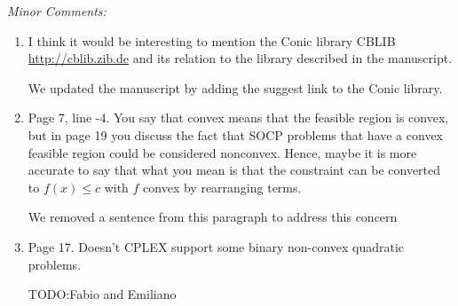 \documentclass[11pt]{article}
\newcommand{\rep}[1]{{\textcolor{acblue}{#1}}}
\newcommand{\leo}[1]{{\color{red}#1}}
\begin{document}
{\it
Minor Comments:
\begin{enumerate}

\item I think it would be interesting to mention the Conic library CBLIB \url{http://cblib.zib.de} and its relation to the library described in the manuscript.

\rep{We updated the manuscript by adding the suggest link to the Conic library.}


\item Page 7, line -4. You say that convex means that the feasible region is
convex, but in page 19 you discuss the fact that SOCP problems that have
a convex feasible region could be considered nonconvex. Hence, maybe it
is more accurate to say that what you mean is that the constraint can be
converted to $f (x) \le c$ with $f$ convex by rearranging terms.

\rep{We removed a sentence from this paragraph to address this concern
}

\item Page 17. Doesn't CPLEX support some binary non-convex quadratic
problems.

\rep{ TODO:Fabio and Emiliano
}


\end{enumerate}}
\end{document}
